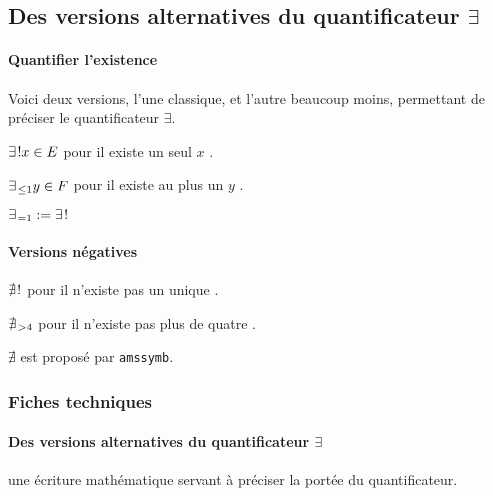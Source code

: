 \documentclass[12pt,a4paper]{article}
\newcommand\eqdef{:=}
\begin{document}

\subsection{\texorpdfstring{Des versions alternatives du quantificateur $\exists$}%
                           {Des versions alternatives du quantificateur existentiel}}
         
\paragraph{Quantifier l'existence}

Voici deux versions, l'une classique, et l'autre beaucoup moins, permettant de préciser le quantificateur $\exists$.

\begin{latexex}
$\exists\kern0.1em ! x \in E$
pour \og il existe un seul $x$ \fg.

$\exists_{\kern0.1em \leq 1} y \in F$
pour \og il existe au plus un $y$ \fg.

$\existmulti{=1} \eqdef \existsone$
\end{latexex}




\paragraph{Versions négatives}

\begin{latexex}
$\nexists\kern0.1em !$
pour \og il n'existe pas un unique \fg.

$\nexists_{\kern0.1em >4}$
pour \og il n'existe pas plus de
quatre \fg.

$\nexists$
est proposé par \verb+amssymb+.
\end{latexex}




\subsubsection{Fiches techniques}

\paragraph{\texorpdfstring{Des versions alternatives du quantificateur $\exists$}%
                          {Des versions alternatives du quantificateur existentiel}}



 une écriture mathématique servant à préciser la portée du quantificateur.


\separation



\end{document}
